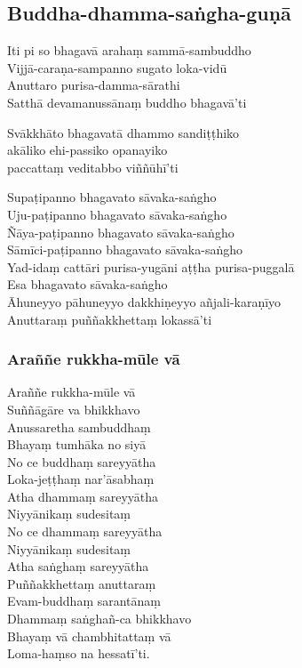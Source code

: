
\subsection{Buddha-dhamma-saṅgha-guṇā}
\label{iti-pi-so}


\begin{paritta}
Iti pi so bhagavā arahaṃ sammā-sambuddho\\
Vijjā-caraṇa-sampanno sugato loka-vidū\\
Anuttaro purisa-damma-sārathi\\
Satthā devamanussānaṃ buddho bhagavā'ti

Svākkhāto bhagavatā dhammo sandiṭṭhiko\\
\vin akāliko ehi-passiko opanayiko\\
paccattaṃ veditabbo viññūhī'ti

\enlargethispage{\baselineskip}

Supaṭipanno bhagavato sāvaka-saṅgho\\
Uju-paṭipanno bhagavato sāvaka-saṅgho\\
Ñāya-paṭipanno bhagavato sāvaka-saṅgho\\
Sāmīci-paṭipanno bhagavato sāvaka-saṅgho\\
Yad-idaṃ cattāri purisa-yugāni aṭṭha purisa-puggalā\\
Esa bhagavato sāvaka-saṅgho\\
Āhuneyyo pāhuneyyo dakkhiṇeyyo añjali-karaṇīyo\\
Anuttaraṃ puññakkhettaṃ lokassā'ti
\end{paritta}

\subsubsection{Araññe rukkha-mūle vā}


\begin{paritta}
Araññe rukkha-mūle vā\\
Suññāgāre va bhikkhavo\\
Anussaretha sambuddhaṃ\\
Bhayaṃ tumhāka no siyā\\
No ce buddhaṃ sareyyātha\\
Loka-jeṭṭhaṃ nar'āsabhaṃ\\
Atha dhammaṃ sareyyātha\\
Niyyānikaṃ sudesitaṃ\\
No ce dhammaṃ sareyyātha\\
Niyyānikaṃ sudesitaṃ\\
Atha saṅghaṃ sareyyātha\\
Puññakkhettaṃ anuttaraṃ\\
Evam-buddhaṃ sarantānaṃ\\
Dhammaṃ saṅghañ-ca bhikkhavo\\
Bhayaṃ vā chambhitattaṃ vā\\
Loma-haṃso na hessatī'ti. 
\end{paritta}

